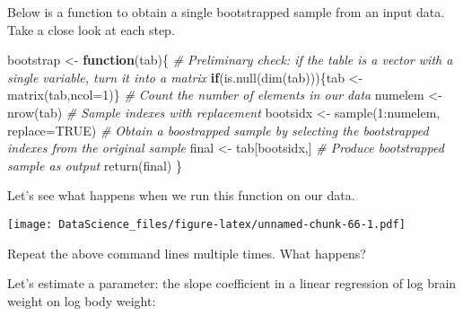 \documentclass[
]{book}
\newenvironment{Shaded}{\begin{snugshade}}{\end{snugshade}}
\newcommand{\AttributeTok}[1]{\textcolor[rgb]{0.77,0.63,0.00}{#1}}
\newcommand{\CommentTok}[1]{\textcolor[rgb]{0.56,0.35,0.01}{\textit{#1}}}
\newcommand{\ConstantTok}[1]{\textcolor[rgb]{0.00,0.00,0.00}{#1}}
\newcommand{\ControlFlowTok}[1]{\textcolor[rgb]{0.13,0.29,0.53}{\textbf{#1}}}
\newcommand{\DecValTok}[1]{\textcolor[rgb]{0.00,0.00,0.81}{#1}}
\newcommand{\FunctionTok}[1]{\textcolor[rgb]{0.00,0.00,0.00}{#1}}
\newcommand{\NormalTok}[1]{#1}
\newcommand{\OtherTok}[1]{\textcolor[rgb]{0.56,0.35,0.01}{#1}}
\newcommand{\SpecialCharTok}[1]{\textcolor[rgb]{0.00,0.00,0.00}{#1}}
\begin{document}
Below is a function to obtain a single bootstrapped sample from an input data. Take a close look at each step.

\begin{Shaded}
\begin{Highlighting}[]
\NormalTok{bootstrap }\OtherTok{\textless{}{-}} \ControlFlowTok{function}\NormalTok{(tab)\{}
  \CommentTok{\# Preliminary check: if the table is a vector with a single variable, turn it into a matrix}
  \ControlFlowTok{if}\NormalTok{(}\FunctionTok{is.null}\NormalTok{(}\FunctionTok{dim}\NormalTok{(tab)))\{tab }\OtherTok{\textless{}{-}} \FunctionTok{matrix}\NormalTok{(tab,}\AttributeTok{ncol=}\DecValTok{1}\NormalTok{)\}}
  \CommentTok{\# Count the number of elements in our data}
\NormalTok{  numelem }\OtherTok{\textless{}{-}} \FunctionTok{nrow}\NormalTok{(tab)}
  \CommentTok{\# Sample indexes with replacement}
\NormalTok{  bootsidx }\OtherTok{\textless{}{-}} \FunctionTok{sample}\NormalTok{(}\DecValTok{1}\SpecialCharTok{:}\NormalTok{numelem, }\AttributeTok{replace=}\ConstantTok{TRUE}\NormalTok{)}
  \CommentTok{\# Obtain a boostrapped sample by selecting the bootstrapped indexes from the original sample}
\NormalTok{  final }\OtherTok{\textless{}{-}}\NormalTok{ tab[bootsidx,]}
  \CommentTok{\# Produce bootstrapped sample as output}
  \FunctionTok{return}\NormalTok{(final)}
\NormalTok{\}}
\end{Highlighting}
\end{Shaded}

Let's see what happens when we run this function on our data.

\begin{Shaded}
\end{Shaded}

\texttt{[image: DataScience\_files/figure-latex/unnamed-chunk-66-1.pdf]}

Repeat the above command lines multiple times. What happens?

Let's estimate a parameter: the slope coefficient in a linear regression of log brain weight on log body weight:

\begin{Shaded}
\end{Shaded}
\end{document}
